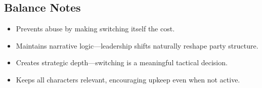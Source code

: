 \subsection*{Balance Notes}
\begin{itemize}
  \item Prevents abuse by making switching itself the cost.  
  \item Maintains narrative logic—leadership shifts naturally reshape party structure.  
  \item Creates strategic depth—switching is a meaningful tactical decision.  
  \item Keeps all characters relevant, encouraging upkeep even when not active.  
\end{itemize}